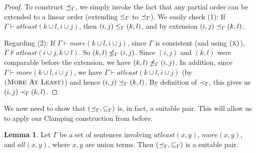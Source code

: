 \documentclass[12pt]{article}
\theoremstyle{definition}
\newtheorem{lemma}[theorem]{Lemma}
\begin{document}
\begin{proof}
To construct $\preceq_{\Gamma}$, we simply invoke the fact that any partial order can be extended to a linear order (extending $\le_{\Gamma}$ to $\preceq_{\Gamma}$).
We easily check (1): If $\Gamma \vdash atleast(k \cup l, i \cup j)$, then $(i,j) \le_{\Gamma} (k,l)$, and by extension $(i,j) \preceq_{\Gamma} (k,l)$.

Regarding (2): If $\Gamma \vdash more(k \cup l, i \cup j)$, since $\Gamma$ is consistent (and using $\textsc{(x)}$), $\Gamma \nvdash atleast(i \cup j, k \cup l)$.  So $(k,l) \nleq_{\Gamma} (i,j)$.  
Since $(i,j)$ and $(k,l)$ were comparable before the extension, we have $(k,l) \npreceq_{\Gamma} (i,j)$.  In addition, since $\Gamma \vdash more(k \cup l, i \cup j)$, we have $\Gamma \vdash atleast(k \cup l, i \cup j)$ (by $\textsc{(More At Least)}$) and hence $(i,j) \preceq_{\Gamma} (k,l)$.  By definition of $\prec_{\Gamma}$, this gives us $(i,j) \prec_{\Gamma} (k,l)$.

\end{proof}

We now need to show that $(\preceq_{\Gamma}, \subseteq_{\Gamma})$ is, in fact, a suitable pair. This will allow us to apply our Clamping construction from before.  

\begin{lemma}
    Let $\Gamma$ be a set of sentences involving $atleast(x, y)$, $more(x, y)$, and $all(x, y)$, where $x, y$ are union terms.  Then $(\preceq_{\Gamma}, \subseteq_{\Gamma})$ is a suitable pair.
    
\end{lemma}
\end{document}
